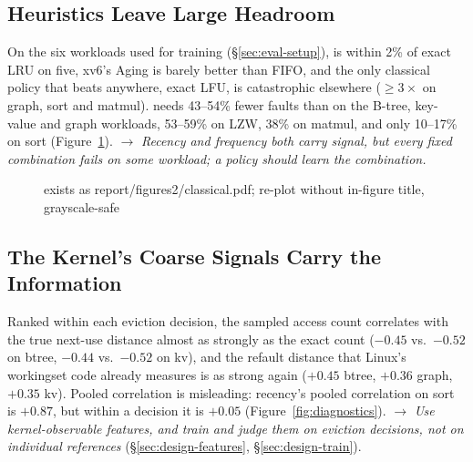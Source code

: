 \subsection{Heuristics Leave Large Headroom}
\label{sec:bg-headroom}

On the six workloads used for training (\S\ref{sec:eval-setup}), \clock is within 2\%
of exact LRU on five, xv6's Aging is barely better than FIFO, and the only classical
policy that beats \clock anywhere, exact LFU, is catastrophic elsewhere
($\geq3\times$ \clock on graph, sort and matmul). \belady needs 43--54\% fewer faults
than \clock on the B-tree, key-value and graph workloads, 53--59\% on LZW, 38\% on
matmul, and only 10--17\% on sort (Figure~\ref{fig:headroom}).
$\rightarrow$ \emph{Recency and frequency both carry signal, but every fixed combination
fails on some workload; a policy should learn the combination.}

\begin{figure}[t]
\centering
{}
{exists as report/figures2/classical.pdf; re-plot without in-figure title, grayscale-safe}
\caption{}
\label{fig:headroom}
\end{figure}

\subsection{The Kernel's Coarse Signals Carry the Information}
\label{sec:bg-signals}

Ranked within each eviction decision, the sampled access count  correlates
with the true next-use distance almost as strongly as the exact count 
($-0.45$ vs.\ $-0.52$ on btree, $-0.44$ vs.\ $-0.52$ on kv), and the refault distance
that Linux's workingset code already measures is as strong again ($+0.45$ btree,
$+0.36$ graph, $+0.35$ kv). Pooled correlation is misleading: recency's pooled
correlation on sort is $+0.87$, but within a decision it is $+0.05$
(Figure~\ref{fig:diagnostics}).
$\rightarrow$ \emph{Use kernel-observable features, and train and judge them on eviction
decisions, not on individual references} (\S\ref{sec:design-features},
\S\ref{sec:design-train}).


